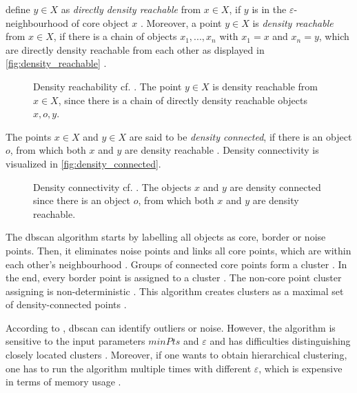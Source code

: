 \citeauthor{OPTICS_kMeans_2016} define $y \in X$ as \textit{directly density reachable} from $x \in X$, if $y$ is in the $\varepsilon$-neighbourhood of core object $x$ \cite{OPTICS_kMeans_2016}.
Moreover, a point $y \in X$ is \textit{density reachable} from $x \in X$, if there is a chain of objects $x_1, ..., x_n$ with $x_1 = x$ and $x_n = y$, 
which are directly density reachable from each other as displayed in \autoref{fig:density_reachable} \cite{OPTICS_kMeans_2016}.

\begin{figure}[htp] %
    \centering
    
    \caption{Density reachability cf. \cite{OPTICS1999}.
    The point $y \in X$ is density reachable from $x \in X$, since there is a chain of directly density reachable objects $x, o, y$.
    }
    \label{fig:density_reachable}
\end{figure}

The points $x \in X$ and $y \in X$ are said to be \textit{density connected}, if there is an object $o$, from which both $x$ and $y$ are density reachable \cite{OPTICS_kMeans_2016}.
Density connectivity is visualized in \autoref{fig:density_connected}.

\begin{figure}[htp] %
    \centering
    
    \caption{Density connectivity cf. \cite{OPTICS1999}.
    The objects $x$ and $y$ are density connected since there is an object $o$, from which both $x$ and $y$ are density reachable.
    }
    \label{fig:density_connected}
\end{figure}

The \ac{dbscan} algorithm starts by labelling all objects as core, border or noise points.
Then, it eliminates noise points and links all core points, which are within each other's neighbourhood \cite{OPTICS_kMeans_2016}.
Groups of connected core points form a cluster \cite{OPTICS_kMeans_2016}.
In the end, every border point is assigned to a cluster \cite{OPTICS_kMeans_2016}.
The non-core point cluster assigning is non-deterministic \cite{OPTICS2013}.
This algorithm creates clusters as a maximal set of density-connected points \cite{OPTICS_kMeans_2016}.

According to \citeauthor{OPTICS_kMeans_2016}, \ac{dbscan} can identify outliers or noise.
However, the algorithm is sensitive to the input parameters $minPts$ and $\varepsilon$ and has difficulties distinguishing closely located clusters \cite{OPTICS_kMeans_2016}.
Moreover, if one wants to obtain hierarchical clustering, one has to run the algorithm multiple times with different $\varepsilon$, which is expensive in terms of memory usage \cite{OPTICS2013}.



